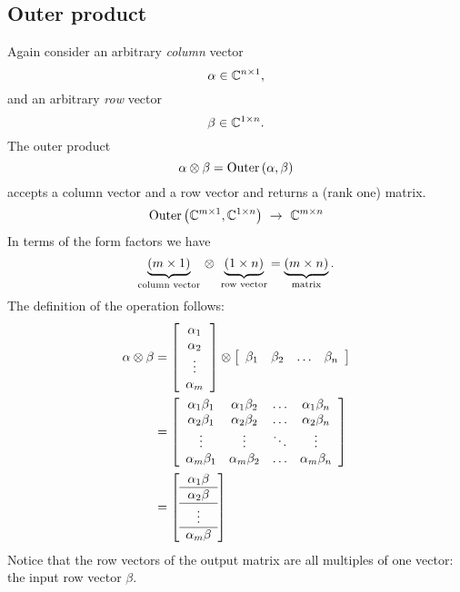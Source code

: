\subsection{Outer product}
Again consider an arbitrary \textit{column} vector
\begin{equation*}
  \alpha \in \mathbb{C}^{n \times 1},
\end{equation*}
and an arbitrary \textit{row} vector 
\begin{equation*}
  \beta \in \mathbb{C}^{1 \times n}.
\end{equation*}The  outer product\begin{equation}
  \alpha\otimes\beta = \text{Outer}\left( \alpha,\beta \right)
\end{equation}
accepts a column vector and a row vector and returns a (rank one) matrix.
\begin{equation}
  \text{Outer}\left( \mathbb{C}^{m\times 1},\mathbb{C}^{1\times n} \right)\ \to\  \mathbb{C}^{m\times n}
\end{equation}
In terms of the form factors we have
\begin{equation}
\underbrace{\left( m \times 1 \right)}_{\text{column vector}}\,\otimes\ \underbrace{\left( 1 \times n \right)}_{\text{row vector}}=\underbrace{\left( m \times n \right)}_{\text{matrix}}.
\end{equation}
The definition of the operation follows:
\begin{equation}
  \begin{split}
   \alpha \otimes \beta &= \mat{c}{\alpha_{1}\\\alpha_{2}\\\vdots\\\alpha_{m}} \otimes \mat{cccc}{\beta_{1}&\beta_{2}&\dots&\beta_{n}}\\
    &= \mat{cccc}
    {
    \alpha_{1} \beta_{1} & \alpha_{1} \beta_{2} & \dots & \alpha_{1} \beta_{n}\\
    \alpha_{2} \beta_{1} & \alpha_{2} \beta_{2} & \dots & \alpha_{2} \beta_{n}\\
    \vdots & \vdots & \ddots & \vdots\\
    \alpha_{m} \beta_{1} & \alpha_{m} \beta_{2} & \dots & \alpha_{m} \beta_{n}\\
    }\\
    &= \mat{c}{\alpha_{1}\beta\\\hline\alpha_{2}\beta\\\hline\vdots\\\hline\alpha_{m}\beta}
  \end{split}
  \label{prelim:vectors:outer}
\end{equation}
Notice that the row vectors of the output matrix are all multiples of one vector: the input row vector $\beta$.

